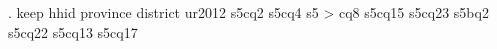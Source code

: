 . keep hhid province district ur2012 s5cq2 s5cq4 s5
> cq8 s5cq15 s5cq23 s5bq2 s5cq22 s5cq13 s5cq17 
{\smallskip}
